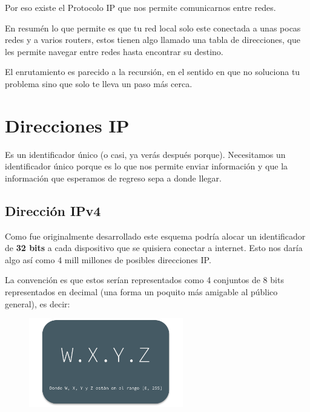 \documentclass[12pt, fleqn]{report}                             %
\theoremstyle{break}                                            %
\begin{document}
            Por eso existe el Protocolo IP que nos permite comunicarnos entre redes.

            En resumén lo que permite es que tu red local solo este conectada a unas pocas redes y a
            varios routers, estos tienen algo llamado una tabla de direcciones, que les permite navegar
            entre redes hasta encontrar su destino. 

            El enrutamiento es parecido a la recursión, en el sentido en que no soluciona tu problema
            sino que solo te lleva un paso más cerca.





        \clearpage
        \section{Direcciones IP}

            Es un identificador único (o casi, ya verás después porque). Necesitamos
            un identificador único porque es lo que nos permite enviar información y que 
            la información que esperamos de regreso sepa a donde llegar.

            \subsection{Dirección IPv4}

                Como fue originalmente desarrollado este esquema podría alocar un identificador
                de \textbf{32 bits} a cada dispositivo que se quisiera conectar a internet.
                Esto nos daría algo así como 4 mill millones de posibles direcciones IP.

                La convención es que estos serían representados como 4 conjuntos de 8 bits representados
                en decimal (una forma un poquito más amigable al público general), es decir:

                \begin{figure}[h]
                    \centering
                    \includegraphics[width=0.60\textwidth]{IPv4}
                \end{figure}
\end{document}
